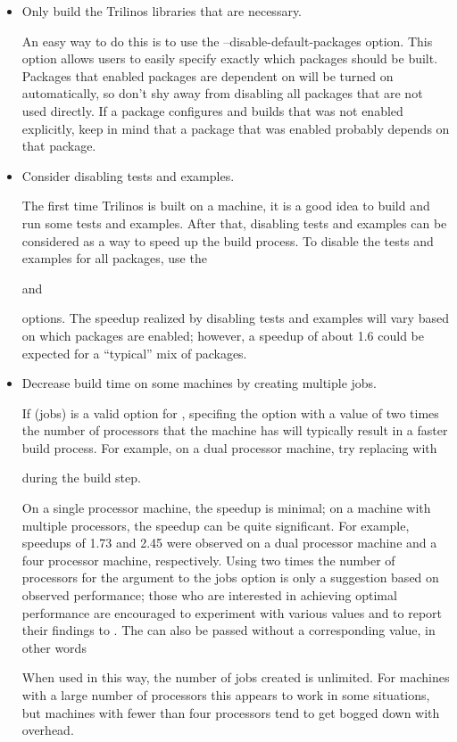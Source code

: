 \begin{itemize}
\item Only build the Trilinos libraries that are necessary.

An easy way to do this is to use the --disable-default-packages option.  
This option allows users to easily specify exactly which packages should be 
built.  Packages that enabled 
packages are dependent on will be turned on automatically, so
don't shy away from disabling all packages that are not used directly.  
If a package configures and builds that was not enabled explicitly, 
keep in mind that a package that was enabled probably depends on that package.

\item Consider disabling tests and examples.

The first time Trilinos is built on a machine, it is a good idea to build 
and run some tests and examples.  After that, disabling tests and examples
can be considered as a way to speed up the build process.  To disable 
the tests and examples for all packages, use the 

and


options.  The speedup realized by disabling tests and examples will vary based 
on which packages are enabled; however, a speedup of about 1.6 could be 
expected for a ``typical'' mix of packages.

\item Decrease build time on some machines by creating multiple jobs.

If  (jobs) is a valid option for ,
specifing the  option with a value of two times the number 
of processors that the machine has will typically result in a faster build 
process.  For example, on a dual processor machine, try replacing 
 with 


during the build step.

On a single processor machine, the speedup is minimal; on a machine with 
multiple processors, the speedup can be quite significant.  For example, 
speedups of 1.73 and 2.45 were observed on a dual processor machine and a four 
processor machine, respectively.  Using two times the number of processors for 
the argument to the jobs option is only a suggestion based on observed 
performance; those who are interested in achieving optimal performance are
encouraged to experiment with various values and to report 
their findings to .  The 
 can also be passed without a corresponding value, in other 
words


When used in this way, the number of jobs created is unlimited.  For machines 
with a large number of processors this appears to work in some situations, but
machines with fewer than four processors tend to get bogged down with 
overhead.

\end{itemize}

